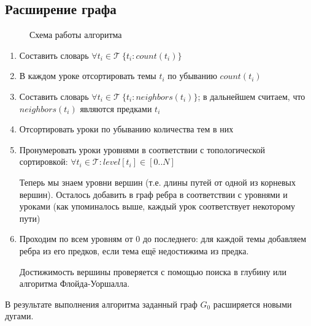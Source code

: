 \documentclass[14pt]{matmex-diploma-custom}
\begin{document}
\subsection{Расширение графа}

\begin{figure}[!htb]
\caption{Схема работы алгоритма}
\label{report}
\end{figure}


\begin{enumerate}
    \item Составить словарь $\forall t_i \in \mathcal{T}~ \{ t_i: count(t_i) \}$
    
    \item В каждом уроке отсортировать темы $t_i$ по убыванию $count(t_i)$
    
    \item Составить словарь $\forall t_i \in \mathcal{T}~ \{ t_i: neighbors(t_i) \}$; в дальнейшем считаем, что $neighbors(t_i)$ являются предками $t_i$
    \item Отсортировать уроки по убыванию количества тем в них
    
    \item Пронумеровать уроки уровнями в соответствии с топологической сортировкой: $\forall t_i \in \mathcal{T}: level[t_i] \in [0..N]$
    
    Теперь мы знаем уровни вершин (т.е. длины путей от одной из корневых вершин).
    Осталось добавить в граф ребра в соответствии с уровнями и уроками (как упоминалось выше, каждый урок соответствует некоторому пути)
    
    \item Проходим по всем уровням от 0 до последнего:
    для каждой темы добавляем ребра из его предков, если тема ещё недостижима из предка.
    
    Достижимость вершины проверяется с помощью поиска в глубину или алгоритма Флойда-Уоршалла.
\end{enumerate}

В результате выполнения алгоритма заданный граф $G_0$ расширяется новыми дугами. %
\end{document}
